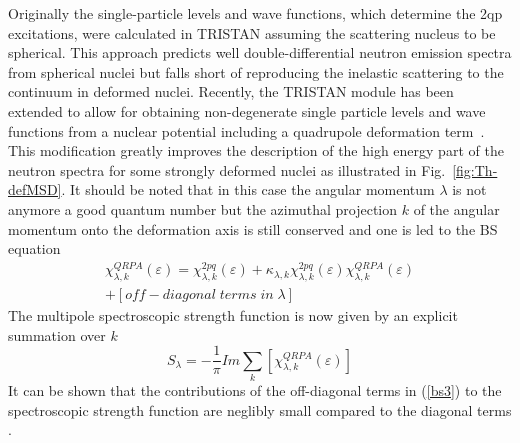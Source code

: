 \documentclass[twocolumn,amsmath,amssymb,10pt,groupedaddress,a4paper]{revtex4}
\begin{document}
\noindent Originally the single-particle levels and wave functions, which determine the 2qp excitations,
were calculated in TRISTAN assuming the scattering nucleus to be spherical.
This approach predicts
well double-differential neutron emission spectra from spherical nuclei but
falls short of reproducing the inelastic scattering to the continuum in deformed nuclei.
Recently, the TRISTAN module has been extended to allow for obtaining non-degenerate
single particle levels and wave functions from a nuclear potential including a quadrupole deformation term~\cite{Wienke:07}.
This modification greatly improves the description of the high energy part of the neutron spectra for some strongly deformed nuclei as illustrated in Fig.~\ref{fig:Th-defMSD}.
It should be noted that in this case the angular momentum $\lambda$ is not anymore a good quantum number
but the azimuthal projection $k$ of the angular momentum onto the deformation axis is still conserved and one is led to the BS equation
\begin{multline}
\chi_{\lambda,k}^{QRPA}(\varepsilon)=  \chi_{\lambda,k}^{2pq}(\varepsilon) + \kappa_{\lambda,k}\chi_{\lambda,k}^{2pq}(\varepsilon)\chi_{\lambda,k}^{QRPA}(\varepsilon)\\
+\left[off-diagonal\;terms\;in\;\lambda\right]\label{bs3}
\end{multline}
The multipole spectroscopic strength function is now given by an explicit summation over $k$ \begin{equation}
S_{\lambda} =-\frac{1}{\pi}Im\sum_k[\chi_{\lambda,k}^{QRPA}(\varepsilon)]\label{sgrpa}
\end{equation}
It can be shown that the contributions of the off-diagonal terms in (\ref{bs3}) to the
spectroscopic strength function are neglibly small compared to the diagonal
terms \cite{nextpaper}.
%



\end{document}
